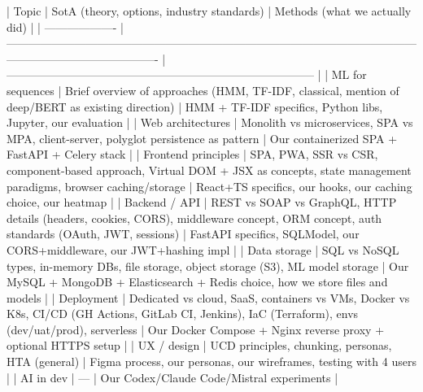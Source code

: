 | Topic               | SotA (theory, options, industry standards)                                                                                                           | Methods (what we actually did)                                                    |
| ------------------- | ---------------------------------------------------------------------------------------------------------------------------------------------------- | --------------------------------------------------------------------------------- |
| ML for sequences    | Brief overview of approaches (HMM, TF-IDF, classical, mention of deep/BERT as existing direction)                                                    | HMM + TF-IDF specifics, Python libs, Jupyter, our evaluation                      |
| Web architectures   | Monolith vs microservices, SPA vs MPA, client-server, polyglot persistence as pattern                                                                | Our containerized SPA + FastAPI + Celery stack                                    |
| Frontend principles | SPA, PWA, SSR vs CSR, component-based approach, Virtual DOM + JSX as concepts, state management paradigms, browser caching/storage                   | React+TS specifics, our hooks, our caching choice, our heatmap                    |
| Backend / API       | REST vs SOAP vs GraphQL, HTTP details (headers, cookies, CORS), middleware concept, ORM concept, auth standards (OAuth, JWT, sessions)               | FastAPI specifics, SQLModel, our CORS+middleware, our JWT+hashing impl            |
| Data storage        | SQL vs NoSQL types, in-memory DBs, file storage, object storage (S3), ML model storage                                                               | Our MySQL + MongoDB + Elasticsearch + Redis choice, how we store files and models |
| Deployment          | Dedicated vs cloud, SaaS, containers vs VMs, Docker vs K8s, CI/CD (GH Actions, GitLab CI, Jenkins), IaC (Terraform), envs (dev/uat/prod), serverless | Our Docker Compose + Nginx reverse proxy + optional HTTPS setup                   |
| UX / design         | UCD principles, chunking, personas, HTA (general)                                                                                                    | Figma process, our personas, our wireframes, testing with 4 users                 |
| AI in dev           | —                                                                                                                                                    | Our Codex/Claude Code/Mistral experiments                                         |

